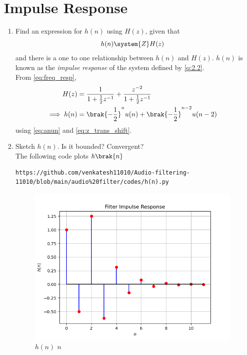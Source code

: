 \documentclass[journal,12pt,twocolumn]{IEEEtran}
\theoremstyle{remark}
\begin{document}
\section{Impulse Response}
\begin{enumerate}[label=\thesection.\arabic*]
\item \label{prob:impulse_resp}
Find an expression for $h(n)$ using $H(z)$, given that 
\begin{equation}
\label{eq:impulse_resp}
h(n) \system{Z} H(z)
\end{equation}
and there is a one to one relationship between $h(n)$ and $H(z)$. $h(n)$ is known as the {\em impulse response} of the
system defined by \eqref{q:2.2}.
\\
\solution From \eqref{eq:freq_resp},
\begin{align}
H(z) &= \frac{1}{1 + \frac{1}{2}z^{-1}} + \frac{ z^{-2}}{1 + \frac{1}{2}z^{-1}}
\\
\implies h(n) &= \brak{-\frac{1}{2}}^{n}u(n) + \brak{-\frac{1}{2}}^{n-2}u(n-2)
\end{align}
using \eqref{eq:anun} and \eqref{eq:z_trans_shift}.
\item Sketch $h(n)$. Is it bounded? Convergent? 
\\
\solution The following code plots $h\brak{n}$ 
\begin{lstlisting}
https://github.com/venkatesh11010/Audio-filtering-11010/blob/main/audio%20filter/codes/h(n).py
\end{lstlisting}
\begin{figure}[!ht]
\centering
\includegraphics[width=\columnwidth]{figs/h(n)}
\caption{$h(n)$  $n$}
\label{fig:hn}
\end{figure}


\end{enumerate}
\end{document}
